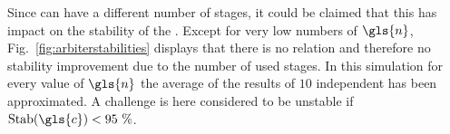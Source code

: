 Since \apufs can have a different number of stages, it could be claimed that this has impact on the stability of the \puf.
Except for very low numbers of $\gls{n}$, Fig.\ \ref{fig:arbiterstabilities} displays that there is no relation and therefore no stability improvement due to the number of used stages. %
In this simulation for every value of $\gls{n}$ the average of the results of $10$ independent \apufs has been approximated.
A challenge is here considered to be unstable if $\Stab(\gls{c}) < 95\ \%$.


